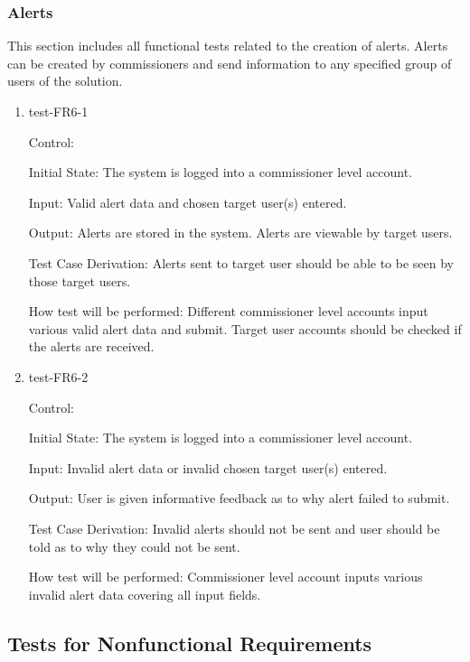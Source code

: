 \documentclass[12pt, titlepage]{article}
\begin{document}
\subsubsection{Alerts}

This section includes all functional tests related to the creation of alerts.
Alerts can be created by commissioners and send information to any specified
group of users of the solution.

\begin{enumerate}

  \item{test-FR6-1\\}

  Control: 

  Initial State: The system is logged into a commissioner level account.

  Input: Valid alert data and chosen target user(s) entered.

  Output: Alerts are stored in the system. Alerts are viewable by target users.

  Test Case Derivation: Alerts sent to target user should be able to be 
  seen by those target users.

  How test will be performed: Different commissioner level accounts input
  various valid alert data and submit. Target user accounts should be checked
  if the alerts are received.

  \item{test-FR6-2\\}

  Control: 

  Initial State: The system is logged into a commissioner level account.

  Input: Invalid alert data or invalid chosen target user(s) entered.

  Output: User is given informative feedback as to why alert failed to submit.

  Test Case Derivation: Invalid alerts should not be sent and user should
  be told as to why they could not be sent.

  How test will be performed: Commissioner level account inputs various invalid
  alert data covering all input fields.

\end{enumerate}

\subsection{Tests for Nonfunctional Requirements}
\end{document}
